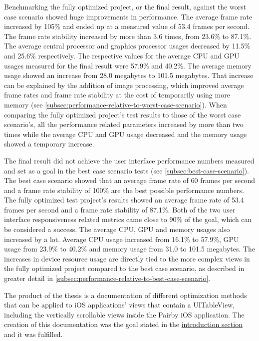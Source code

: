 \documentclass[a4paper,12pt]{article}
\begin{document}
Benchmarking the fully optimized project, or the final result, against the worst case scenario showed huge improvements in performance. The average frame rate increased by 105\% and ended up at a measured value of 53.4 frames per second. The frame rate stability increased by more than 3.6 times, from 23.6\% to 87.1\%. The average central processor and graphics processor usages decreased by 11.5\% and 25.6\% respectively. The respective values for the average CPU and GPU usages measured for the final result were 57.9\% and 40.2\%. The average memory usage showed an increase from 28.0 megabytes to 101.5 megabytes. That increase can be explained by the addition of image processing, which improved average frame rates and frame rate stability at the cost of temporarily using more memory (see \autoref{subsec:performance-relative-to-worst-case-scenario}). When comparing the fully optimized project's test results to those of the worst case scenario's, all the performance related parameters increased by more than two times while the average CPU and GPU usage decreased and the memory usage showed a temporary increase.

The final result did not achieve the user interface performance numbers measured and set as a goal in the best case scenario tests (see \autoref{subsec:best-case-scenario}). The best case scenario showed that an average frame rate of 60 frames per second and a frame rate stability of 100\% are the best possible performance numbers. The fully optimized test project's results showed an average frame rate of 53.4 frames per second and a frame rate stability of 87.1\%. Both of the two user interface responsiveness related metrics came close to 90\% of the goal, which can be considered a success. The average CPU, GPU and memory usages also increased by a lot. Average CPU usage increased from 16.1\% to 57.9\%, GPU usage from 23.9\% to 40.2\% and memory usage from 31.0 to 101.5 megabytes. The increases in device resource usage are directly tied to the more complex views in the fully optimized project compared to the best case scenario, as described in greater detail in \autoref{subsec:performance-relative-to-best-case-scenario}.

The product of the thesis is a documentation of different optimization methods that can be applied to iOS applications' views that contain a UITableView, including the vertically scrollable views inside the Pairby iOS application. The creation of this documentation was the goal stated in the \hyperref[subsec:goal-of-the-thesis]{introduction section} and it was fulfilled.


\newpage
{}
{}
\listoffigures

\newpage
{}
{}


\end{document}
